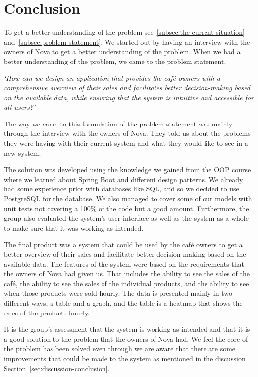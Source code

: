 \pagebreak
\section{Conclusion}\label{sec:conclusion}
To get a better understanding of the problem see~\ref{subsec:the-current-situation} and~\ref{subsec:problem-statement}.
We started out by having an interview with the owners of Nova to get a better understanding of the problem.
When we had a better understanding of the problem, we came to the problem statement.

\textit{`How can we design an application that provides the café owners with a comprehensive overview of their sales and
facilitates better decision-making based on the available data, while ensuring that the system is intuitive and
accessible for all users?'}

The way we came to this formulation of the problem statement was mainly through the interview with the owners of Nova.
They told us about the problems they were having with their current system and what they would like to see in a
new system.

The solution was developed using the knowledge we gained from the OOP course where we learned about Spring Boot and
different design patterns.
We already had some experience prior with databases like SQL, and so we decided to use PostgreSQL for the database.
We also managed to cover some of our models with unit tests not covering a 100\% of the code but a good amount.
Furthermore, the group also evaluated the system's user interface as well as the system as a whole to make sure that it
was working as intended.

The final product was a system that could be used by the café owners to get a better overview of their sales and
facilitate better decision-making based on the available data.
The features of the system were based on the requirements that the owners of Nova had given us.
That includes the ability to see the sales of the café, the ability to see the sales of the individual products, and the
ability to see when those products were sold hourly.
The data is presented mainly in two different ways, a table and a graph, and the table is a heatmap that shows the sales
of the products hourly.

It is the group's assessment that the system is working as intended
and that it is a good solution to the problem that the owners of Nova had.
We feel the core of the problem has been solved even through we are aware that there are some improvements that could
be made to the system as mentioned in the discussion Section~\ref{sec:discussion-conclusion}.
